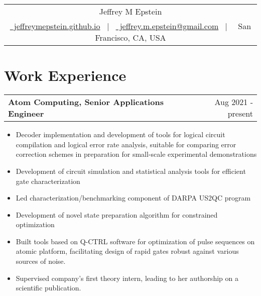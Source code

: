 \documentclass{article}
\makeatletter
\newenvironment{joblong}[2]
{
	\begin{tabularx}{\linewidth}{@{}l X r@{}}
		\textbf{#1} & \hfill &  #2 \\[3.75pt]
	\end{tabularx}
	\begin{minipage}[t]{\linewidth}
		\begin{itemize}[nosep,after=\strut, leftmargin=1em, itemsep=3pt,label=--]
		}
		{
		\end{itemize}
	\end{minipage}    
}
\makeatother
\begin{document}
	
	\pagestyle{empty} 
	
	
	
	\begin{tabularx}{\linewidth}{@{} C @{}}
		\Huge{Jeffrey M Epstein} \\[7.5pt]
		\href{https://jeffreymepstein.github.io/}{\raisebox{-0.05\height}\faGlobe \ jeffreymepstein.github.io} \ $|$ \ 
		\href{mailto:jeffrey.m.epstein@gmail.com}{\raisebox{-0.05\height}\faEnvelope \ jeffrey.m.epstein@gmail.com} \ $|$ \  {\raisebox{-0.05\height}\faMapMarker  \ San Francisco, CA, USA}
		
	\end{tabularx}
	
	

	\section{Work Experience}
	
	\begin{joblong}{Atom Computing, Senior Applications Engineer}{Aug 2021 - present}
\item Decoder implementation and development of tools for logical circuit compilation and logical error rate analysis, suitable for comparing error correction schemes in preparation for small-scale experimental demonstrations
\item Development of circuit simulation and statistical analysis tools for efficient gate characterization
\item Led characterization/benchmarking component of DARPA US2QC program
\item Development of novel state preparation algorithm for constrained optimization

\item Built tools based on Q-CTRL software for optimization of pulse sequences on atomic platform,
facilitating design of rapid gates robust against various sources of noise.

\item Supervised company’s first theory intern, leading to her authorship on a scientific publication.
\end{joblong}
	
\end{document}
